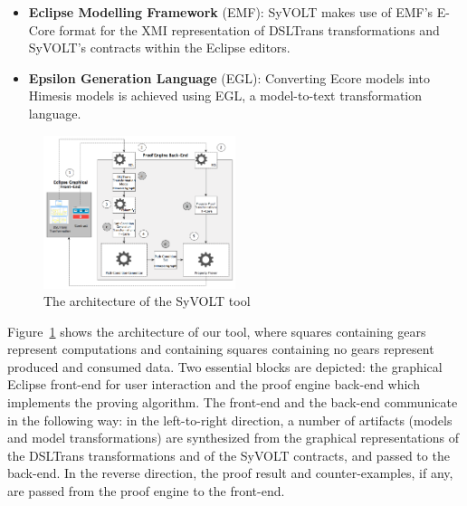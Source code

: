 \begin{itemize}
  \item \textbf{Eclipse Modelling Framework} (EMF): SyVOLT makes
  use of EMF's E-Core format for the XMI representation of DSLTrans transformations
  and SyVOLT's contracts within the Eclipse editors.
  \item \textbf{Epsilon Generation Language} (EGL): Converting
  Ecore models into Himesis models is achieved using EGL, a
  model-to-text transformation language.
\end{itemize}

\begin{figure}
\centering
\includegraphics[width=0.5\textwidth]{figures/tooling_arch}
\caption{The architecture of the SyVOLT tool}
\label{fig:arch}
\end{figure}


Figure~\ref{fig:arch} shows the architecture of our tool, where
squares containing gears represent computations and containing squares
containing no gears represent produced and consumed data.
Two essential blocks are depicted: the graphical Eclipse front-end for user
interaction and the proof engine back-end which implements the proving algorithm. The front-end and the back-end communicate in the following way:
in the left-to-right direction, a number of artifacts (models and model
transformations) are synthesized from the graphical representations of the
DSLTrans transformations and of the SyVOLT contracts, and passed to the
back-end. In the reverse direction, the proof result and counter-examples, if
any, are passed from the proof engine to the front-end.

